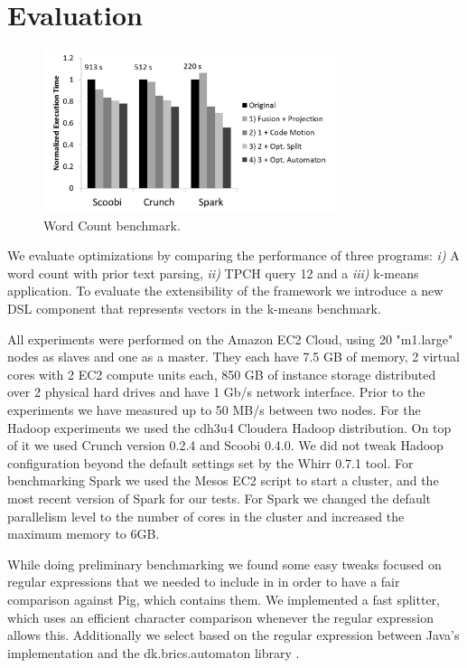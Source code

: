 \section{Evaluation}
\label{sec:evaluation}
\begin{figure}[t]
    \includegraphics[width=8.6cm]{figures/word-count}
   \caption{Word Count benchmark.}
   \label{fig:word-count}%
\end{figure}
We evaluate \tool optimizations by comparing the performance of three programs:
\emph{i)} A word count with prior text parsing, \emph{ii)} TPCH \cite{tpch}
query 12 and a  \emph{iii)} k-means application. To evaluate the extensibility
of the framework we introduce a new DSL component that represents vectors in the
k-means benchmark.

All experiments were performed on the Amazon EC2 Cloud, using 20 "m1.large"
nodes as slaves and one as a master. They each have 7.5 GB of memory, 2 virtual
cores with 2 EC2 compute units each, 850 GB of instance storage distributed over
2 physical hard drives and have 1 Gb/s network interface. Prior to the
experiments we have measured up to 50 MB/s between two nodes. For the Hadoop
experiments we used the cdh3u4 Cloudera Hadoop distribution. On top of it we
used Crunch version 0.2.4 and Scoobi 0.4.0. We did not tweak Hadoop
configuration beyond the default settings set by the Whirr 0.7.1 \cite{whirr}
tool. For benchmarking Spark we used the Mesos \cite{hindman_mesos:_2011} EC2
script to start a cluster, and the most recent version of Spark for our tests.
For Spark we changed the default parallelism level to the number of cores in the
cluster and increased the maximum memory to 6GB.

While doing preliminary benchmarking we found some easy tweaks focused on
regular expressions that we needed to include in \tool in order to have a fair
comparison against Pig, which contains them. We implemented a fast splitter,
which uses an efficient character comparison whenever the regular expression
allows this. Additionally we select based on the regular expression between
Java's implementation and the dk.brics.automaton library \cite{mollerdk}.

